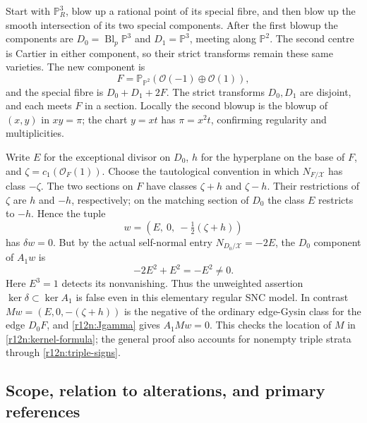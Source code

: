 Start with $\mathbb P^3_R$, blow up a rational point of its special
fibre, and then blow up the smooth intersection of its two special
components.  After the first blowup the components are
$D_0=\operatorname{Bl}_p\mathbb P^3$ and $D_1=\mathbb P^3$, meeting
along $\mathbb P^2$.  The second centre is Cartier in either
component, so their strict transforms remain these same varieties.
The new component is
\[
       F=\mathbb P_{\mathbb P^2}
                    (\mathcal O(-1)\oplus\mathcal O(1)),
\]
and the special fibre is $D_0+D_1+2F$.  The strict transforms
$D_0,D_1$ are disjoint, and each meets $F$ in a section.  Locally the
second blowup is the blowup of $(x,y)$ in $xy=\pi$; the chart
$y=xt$ has $\pi=x^2t$, confirming regularity and multiplicities.

Write $E$ for the exceptional divisor on $D_0$, $h$ for the
hyperplane on the base of $F$, and $\zeta=c_1(\mathcal O_F(1))$.
Choose the tautological convention in which $N_{F/\mathcal X}$
has class $-\zeta$.  The two sections on $F$ have classes
$\zeta+h$ and $\zeta-h$.  Their restrictions of $\zeta$ are $h$
and $-h$, respectively; on the matching section of $D_0$ the class
$E$ restricts to $-h$.  Hence the tuple
\[
               w=(E,\ 0,\ -\tfrac12(\zeta+h))
\]
has $\delta w=0$.  But by the actual self-normal entry
$N_{D_0/\mathcal X}=-2E$, the $D_0$ component of $A_1w$ is
\[
                       -2E^2+E^2=-E^2\ne0.
\]
Here $E^3=1$ detects its nonvanishing.  Thus the unweighted assertion
$\ker\delta\subset\ker A_1$ is false even in this elementary
regular SNC model.  In contrast
$Mw=(E,0,-(\zeta+h))$ is the negative of the ordinary edge-Gysin
class for the edge $D_0F$, and \eqref{r12n:Jgamma} gives $A_1Mw=0$.
This checks the location of $M$ in \eqref{r12n:kernel-formula}; the
general proof also accounts for nonempty triple strata through
\eqref{r12n:triple-signs}.

\subsection{Scope, relation to alterations, and primary references}

